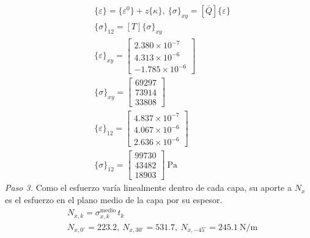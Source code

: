 \documentclass[11pt]{article}
\begin{document}
\begin{align*}
&\{\varepsilon\}=\{\varepsilon^0\}+z\{\kappa\},\ \{\sigma\}_{xy}=[\bar Q]\{\varepsilon\} \\
&\{\sigma\}_{12}=[T]\{\sigma\}_{xy} \\
&\{\varepsilon\}_{xy}=\begin{bmatrix}2.380\times10^{-7} \\ 4.313\times10^{-6} \\ -1.785\times10^{-6}\end{bmatrix} \\
&\{\sigma\}_{xy}=\begin{bmatrix}69297 \\ 73914 \\ 33808\end{bmatrix} \\
&\{\varepsilon\}_{12}=\begin{bmatrix}4.837\times10^{-7} \\ 4.067\times10^{-6} \\ 2.636\times10^{-6}\end{bmatrix} \\
&\{\sigma\}_{12}=\begin{bmatrix}99730 \\ 43482 \\ 18903\end{bmatrix}\ \mathrm{Pa}
\end{align*}
\textit{Paso 3.} Como el esfuerzo varía linealmente dentro de cada capa, su aporte a $N_x$ es el esfuerzo en el plano medio de la capa por su espesor.
\begin{align*}
&N_{x,k}=\sigma_{x,k}^{\text{medio}}\,t_k \\
&N_{x,0^\circ}=223.2,\ N_{x,30^\circ}=531.7,\ N_{x,-45^\circ}=245.1\ \mathrm{N/m}
\end{align*}
\end{document}
